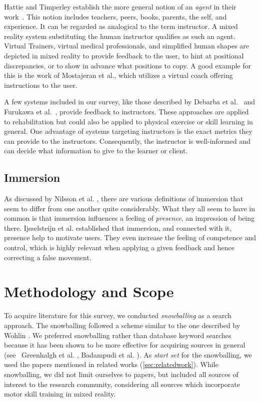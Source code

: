 Hattie and Timperley establish the more general notion of an \emph{agent} in their work~\cite{hattie:2007:Feedback}. This notion includes teachers, peers, books, parents, the self, and experience. It can be regarded as analogical to the term instructor. A mixed reality system substituting the human instructor qualifies as such an agent. Virtual Trainers, virtual medical professionals, and simplified human shapes are depicted in mixed reality to provide feedback to the user, to hint at positional discrepancies, or to show in advance what positions to copy. A good example for this is the work of Mostajeran et al.\cite{mostajeran2019hvc}, which utilizes a virtual coach offering instructions to the user.

A few systems included in our survey, like those described by Debarba et al.~\cite{debarba2018arv} and Furukawa et al.~\cite{furukawa2018dar}, provide feedback to instructors. These approaches are applied to rehabilitation but could also be applied to physical exercise or skill learning in general. One advantage of systems targeting instructors is the exact metrics they can provide to the instructors. Consequently, the instructor is well-informed and can decide what information to give to the learner or client.

\subsection{Immersion \label{sec:immersion}}
As discussed by Nilsson et al. \cite{Nilsson2016irr}, there are various definitions of immersion that seem to differ from one another quite considerably.
What they all seem to have in common is that immersion influences a feeling of \emph{presence}, an impression of being there. Ijsselsteijn et al. \cite{ijsselsteijn2004fas} established that immersion, and connected with it, presence help to motivate users. They even increase the feeling of competence and control, which is highly relevant when applying a given feedback and hence correcting a false movement.

\section{Methodology and Scope \label{sec:tvcg:methodology}}
To acquire literature for this survey, we conducted \emph{snowballing} as a search approach. The snowballing followed a scheme similar to the one described by Wohlin \cite{wohlin2014gss}. We preferred snowballing rather than database keyword searches because it has been shown to be more effective for acquiring sources in general (see \eg\ Greenhalgh et al. \cite{greenhalgh2005ees}, Badampudi et al. \cite{badampudi2015eus}). As \emph{start set} for the snowballing, we used the papers mentioned in related works (\autoref{sec:relatedwork}). While snowballing, we did not limit ourselves to papers, but included all sources of interest to the research community, considering all sources which incorporate motor skill training in mixed reality.


